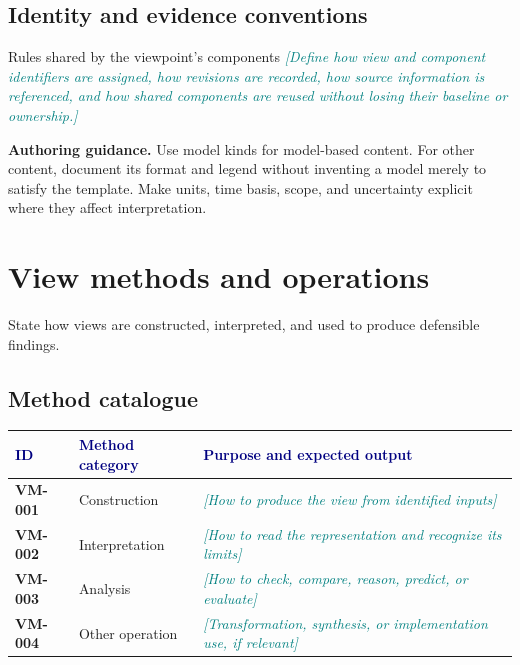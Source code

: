 \documentclass[11pt,letterpaper]{article}
\newcommand{\TemplatePageBreak}{\clearpage}
\newcommand{\FillIn}[1]{\textcolor{Teal}{\sffamily\itshape[#1]}}
\newcommand{\RecordID}[1]{\textsf{\textbf{#1}}}
\newcommand{\TableHead}[1]{\textcolor{Navy}{\sffamily\bfseries#1}}
\newcommand{\Lead}[1]{\textcolor{Muted}{#1}\par\vspace{3pt}}
\newcommand{\Guide}[1]{\par{\small\textcolor{Muted}{\textbf{Authoring guidance.} #1}}\par}
\begin{document}
\subsection{Identity and evidence conventions}
\begin{TemplateRecord}{Rules shared by the viewpoint's components}
\FillIn{Define how view and component identifiers are assigned, how revisions are
recorded, how source information is referenced, and how shared components are
reused without losing their baseline or ownership.}
\end{TemplateRecord}

\Guide{Use model kinds for model-based content. For other content, document its
format and legend without inventing a model merely to satisfy the template.
Make units, time basis, scope, and uncertainty explicit where they affect interpretation.}

\TemplatePageBreak
\section{View methods and operations}
\Lead{State how views are constructed, interpreted, and used to produce defensible findings.}

\subsection{Method catalogue}
{\small
\begin{tabularx}{\linewidth}{@{}L{0.66in}L{1.29in}Y@{}}
\toprule
\TableHead{ID} & \TableHead{Method category} & \TableHead{Purpose and expected output}\\
\midrule
\RecordID{VM-001} & Construction & \FillIn{How to produce the view from identified inputs}\\
\RecordID{VM-002} & Interpretation & \FillIn{How to read the representation and recognize its limits}\\
\RecordID{VM-003} & Analysis & \FillIn{How to check, compare, reason, predict, or evaluate}\\
\RecordID{VM-004} & Other operation & \FillIn{Transformation, synthesis, or implementation use, if relevant}\\
\bottomrule
\end{tabularx}}
\end{document}
